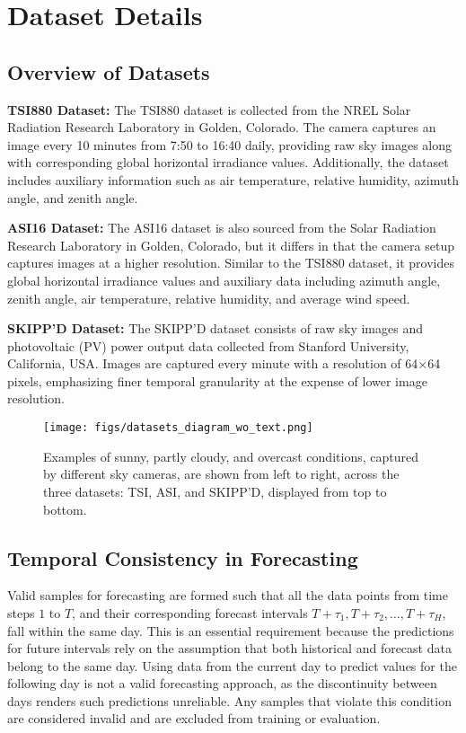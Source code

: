 \section{Dataset Details}
\label{sec:appendix_dataset_details}


\subsection{Overview of Datasets}
\label{subsec:appendix_overview_of_datasets}
\textbf{TSI880 Dataset:}
The TSI880 dataset is collected from the NREL Solar Radiation Research Laboratory in Golden, Colorado. The camera captures an image every 10 minutes from 7:50 to 16:40 daily, providing raw sky images along with corresponding global horizontal irradiance values. Additionally, the dataset includes auxiliary information such as air temperature, relative humidity, azimuth angle, and zenith angle.

\textbf{ASI16 Dataset:}
The ASI16 dataset is also sourced from the Solar Radiation Research Laboratory in Golden, Colorado, but it differs in that the camera setup captures images at a higher resolution. Similar to the TSI880 dataset, it provides global horizontal irradiance values and auxiliary data including azimuth angle, zenith angle, air temperature, relative humidity, and average wind speed.

\textbf{SKIPP'D Dataset:}
The SKIPP'D dataset consists of raw sky images and photovoltaic (PV) power output data collected from Stanford University, California, USA. Images are captured every minute with a resolution of 64×64 pixels, emphasizing finer temporal granularity at the expense of lower image resolution.

\begin{figure}[t]
    \centering
\texttt{[image: figs/datasets\_diagram\_wo\_text.png]}
    
    \caption{Examples of sunny, partly cloudy, and overcast conditions, captured by different sky cameras, are shown from left to right, across the three datasets: TSI, ASI, and SKIPP'D, displayed from top to bottom.}
    \label{fig:dataset_grid}
\end{figure}

\subsection{Temporal Consistency in Forecasting}
\label{subsec:appendix_temporal_consistency_in_forecasting}
Valid samples for forecasting are formed such that all the data points from time steps \( 1 \) to \( T \), and their corresponding forecast intervals \( T + \tau_1, T + \tau_2, \dots, T + \tau_H \), fall within the same day. This is an essential requirement because the predictions for future intervals rely on the assumption that both historical and forecast data belong to the same day. Using data from the current day to predict values for the following day is not a valid forecasting approach, as the discontinuity between days renders such predictions unreliable. Any samples that violate this condition are considered invalid and are excluded from training or evaluation.


